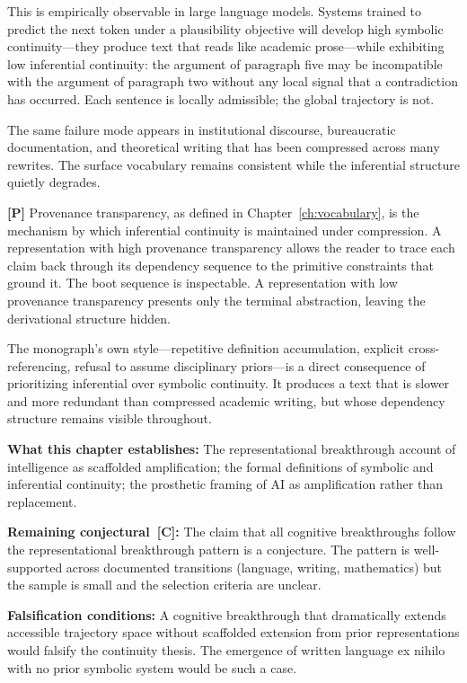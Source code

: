This is empirically observable in large language models. Systems trained to
predict the next token under a plausibility objective will develop high symbolic
continuity---they produce text that reads like academic prose---while exhibiting
low inferential continuity: the argument of paragraph five may be incompatible
with the argument of paragraph two without any local signal that a contradiction
has occurred. Each sentence is locally admissible; the global trajectory is not.

The same failure mode appears in institutional discourse, bureaucratic documentation,
and theoretical writing that has been compressed across many rewrites. The surface
vocabulary remains consistent while the inferential structure quietly degrades.

\textbf{[P]} Provenance transparency, as defined in Chapter~\ref{ch:vocabulary},
is the mechanism by which inferential continuity is maintained under compression.
A representation with high provenance transparency allows the reader to trace
each claim back through its dependency sequence to the primitive constraints that
ground it. The boot sequence is inspectable. A representation with low provenance
transparency presents only the terminal abstraction, leaving the derivational
structure hidden.

The monograph's own style---repetitive definition accumulation, explicit
cross-referencing, refusal to assume disciplinary priors---is a direct consequence
of prioritizing inferential over symbolic continuity. It produces a text that is
slower and more redundant than compressed academic writing, but whose dependency
structure remains visible throughout.

\begin{constraintboundary}
\textbf{What this chapter establishes:} The representational breakthrough account
of intelligence as scaffolded amplification; the formal definitions of symbolic
and inferential continuity; the prosthetic framing of AI as amplification rather
than replacement.

\textbf{Remaining conjectural~\textbf{[C]}:} The claim that all cognitive
breakthroughs follow the representational breakthrough pattern is a conjecture.
The pattern is well-supported across documented transitions (language, writing,
mathematics) but the sample is small and the selection criteria are unclear.

\textbf{Falsification conditions:} A cognitive breakthrough that dramatically
extends accessible trajectory space without scaffolded extension from prior
representations would falsify the continuity thesis. The emergence of written
language ex nihilo with no prior symbolic system would be such a case.
\end{constraintboundary}
